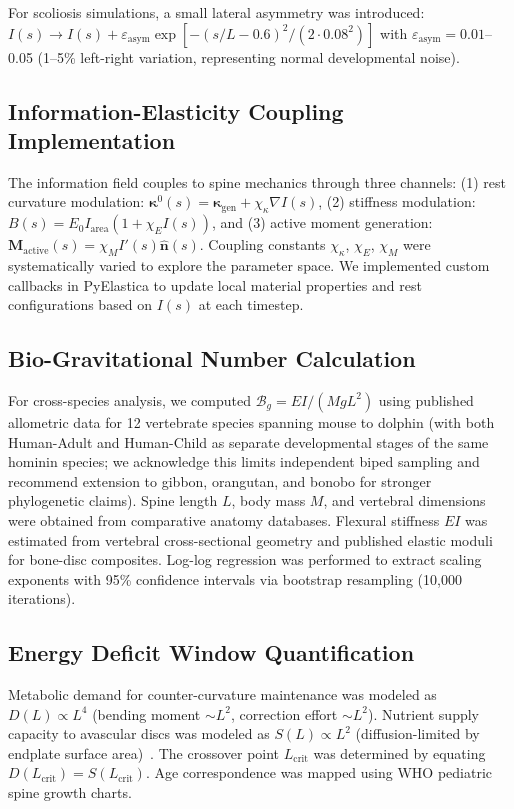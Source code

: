 For scoliosis simulations, a small lateral asymmetry was introduced: $I(s) \to I(s) + \varepsilon_{\mathrm{asym}} \exp[-(s/L - 0.6)^2/(2 \cdot 0.08^2)]$ with $\varepsilon_{\mathrm{asym}} = 0.01$--0.05 (1--5\% left-right variation, representing normal developmental noise).

\subsection{Information-Elasticity Coupling Implementation}

The information field couples to spine mechanics through three channels: (1) rest curvature modulation: $\bm{\kappa}^0(s) = \bm{\kappa}_{\mathrm{gen}} + \chi_\kappa \nabla I(s)$, (2) stiffness modulation: $B(s) = E_0 I_{\mathrm{area}} (1 + \chi_E I(s))$, and (3) active moment generation: $\mathbf{M}_{\mathrm{active}}(s) = \chi_M I'(s) \hat{\mathbf{n}}(s)$. Coupling constants $\chi_\kappa$, $\chi_E$, $\chi_M$ were systematically varied to explore the parameter space. We implemented custom callbacks in PyElastica to update local material properties and rest configurations based on $I(s)$ at each timestep.

\subsection{Bio-Gravitational Number Calculation}

For cross-species analysis, we computed $\mathcal{B}_g = EI/(MgL^2)$ using published allometric data for 12 vertebrate species spanning mouse to dolphin (with both Human-Adult and Human-Child as separate developmental stages of the same hominin species; we acknowledge this limits independent biped sampling and recommend extension to gibbon, orangutan, and bonobo for stronger phylogenetic claims). Spine length $L$, body mass $M$, and vertebral dimensions were obtained from comparative anatomy databases. Flexural stiffness $EI$ was estimated from vertebral cross-sectional geometry and published elastic moduli for bone-disc composites. Log-log regression was performed to extract scaling exponents with 95\% confidence intervals via bootstrap resampling (10,000 iterations).

\subsection{Energy Deficit Window Quantification}

Metabolic demand for counter-curvature maintenance was modeled as $D(L) \propto L^4$ (bending moment $\sim L^2$, correction effort $\sim L^2$). Nutrient supply capacity to avascular discs was modeled as $S(L) \propto L^2$ (diffusion-limited by endplate surface area)~\cite{urban2004nutrition}. The crossover point $L_{\mathrm{crit}}$ was determined by equating $D(L_{\mathrm{crit}}) = S(L_{\mathrm{crit}})$. Age correspondence was mapped using WHO pediatric spine growth charts.

